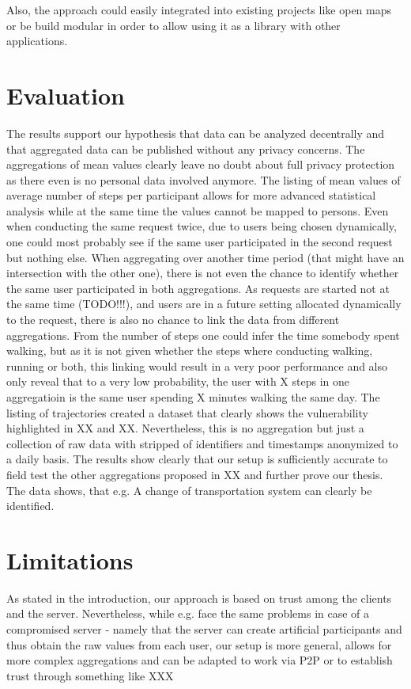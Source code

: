 Also, the approach could easily integrated into existing projects like open maps or be build modular in order to allow using it as a library with other applications.

\section{Evaluation}
The results support our hypothesis that data can be analyzed decentrally and that aggregated data can be published without any privacy concerns. The aggregations of mean values clearly leave no doubt about full privacy protection as there even is no personal data involved anymore. The listing of mean values of average number of steps per participant allows for more advanced statistical analysis while at the same time the values cannot be mapped to persons. Even when conducting the same request twice, due to users being chosen dynamically, one could most probably see if the same user participated in the second request but nothing else. When aggregating over another time period (that might have an intersection with the other one), there is not even the chance to identify whether the same user participated in both aggregations. As requests are started not at the same time (TODO!!!), and users are in a future setting allocated dynamically to the request, there is also no chance to link the data from different aggregations. From the number of steps one could infer the time somebody spent walking, but as it is not given whether the steps where conducting walking, running or both, this linking would result in a very poor performance and also only reveal that to a very low probability, the user with X steps in one aggregatioin is the same user spending X minutes walking the same day. 
The listing of trajectories created a dataset that clearly shows the vulnerability highlighted in XX and XX. Nevertheless, this is no aggregation but just a collection of raw data with stripped of identifiers and timestamps anonymized to a daily basis. The results show clearly that our setup is sufficiently accurate to field test the other aggregations proposed in XX and further prove our thesis. The data shows, that e.g. A change of transportation system can clearly be identified. 

\section{Limitations}
As stated in the introduction, our approach is based on trust among the clients and the server. Nevertheless, while e.g. \parencite{crowdsourcing} face the same problems in case of a compromised server - namely that the server can create artificial participants and thus obtain the raw values from each user, our setup is more general, allows for more complex aggregations and can be adapted to work via P2P or to establish trust through something like XXX